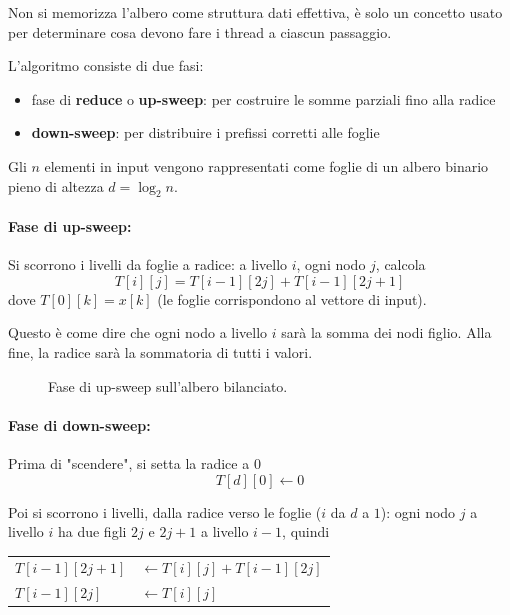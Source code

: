 Non si memorizza l'albero come struttura dati effettiva, è solo un concetto usato per determinare cosa devono fare i thread a ciascun passaggio. 

L'algoritmo consiste di due fasi:
\begin{itemize}
    \item fase di \textbf{reduce} o \textbf{up-sweep}: per costruire le somme parziali fino alla radice
    
    \item \textbf{down-sweep}: per distribuire i prefissi corretti alle foglie
\end{itemize}

Gli $n$ elementi in input vengono rappresentati come foglie di un albero binario pieno di altezza $d = \log_2 n$.

\paragraph{Fase di up-sweep:} Si scorrono i livelli da foglie a radice: a livello $i$, ogni nodo $j$, calcola
$$ T[i][j] = T[i-1][2j] + T[i-1][2j + 1] $$
dove $T[0][k] = x[k]$ (le foglie corrispondono al vettore di input). 

Questo è come dire che ogni nodo a livello $i$ sarà la somma dei nodi figlio. Alla fine, la radice sarà la sommatoria di tutti i valori.

\begin{figure}[htbp]
    \centering
    
    \caption{Fase di up-sweep sull'albero bilanciato.}
    \label{fig:upsweep}
\end{figure}

\paragraph{Fase di down-sweep:} Prima di "scendere", si setta la radice a $0$
$$ T[d][0] \leftarrow 0 $$

Poi si scorrono i livelli, dalla radice verso le foglie ($i$ da $d$ a $1$): ogni nodo $j$ a livello $i$ ha due figli $2j$ e $2j+1$ a livello $i-1$, quindi 
\begin{center}
    \begin{tabular}{l l}
        $T[i-1][2j + 1]$ & $\leftarrow T[i][j] + T[i-1][2j]$ \\
        $T[i-1][2j]$ & $\leftarrow T[i][j]$
    \end{tabular}
\end{center}

